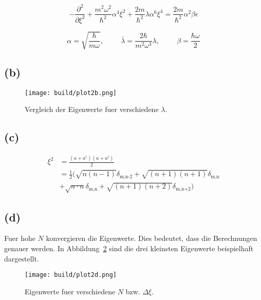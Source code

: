 \documentclass{scrartcl}
\begin{document}
\begin{equation}
		- \frac{\partial^2}{\partial \xi^2} + \frac{m^2
		\omega^2}{\hbar^2} \alpha^4 \xi^2 + \frac{2m}{\hbar^2} \lambda \alpha^6
		\xi^4 = \frac{2m}{\hbar^2} \alpha^2 \beta \epsilon
\end{equation}

\begin{equation}
		\alpha = \sqrt{\frac{\hbar}{m \omega}}, \hspace{1cm} \bar{\lambda} =
		\frac{2 \hbar}{m^2 \omega^3} \lambda, \hspace{1cm} \beta = \frac{\hbar
		\omega}{2}
\end{equation}
\subsection*{(b)}
\begin{figure}[ht]
		\centering
		\texttt{[image: build/plot2b.png]}
		\caption{Vergleich der Eigenwerte fuer verschiedene $\lambda$.}%
		\label{fig:2b}
\end{figure}

\subsection*{(c)}

\begin{align}
		\xi^2 &= \frac{(a + a^\dagger)(a + a^\dagger)}{2} \\
			  &= \frac{1}{2} (
		\sqrt{n(n-1)} \delta_\text{m,n-2} + \sqrt{(n+1)(n+1)} \delta_\text{m,n} \\
		&+ \sqrt{n \cdot n} \delta_\text{m,n} +  \sqrt{(n+1)(n+2)}
		\delta_\text{m,n+2} )
\end{align}

\subsection*{(d)}
Fuer hohe $N$ konvergieren die Eigenwerte.
Dies bedeutet, dass die Berechnungen genauer werden.
In Abbildung~\ref{fig:2d} sind die drei kleinsten Eigenwerte beispielhaft dargestellt.
\begin{figure}[ht]
		\centering
		\texttt{[image: build/plot2d.png]}
		\caption{Eigenwerte fuer verschiedene $N$ bzw. $\Delta \xi$.}%
		\label{fig:2d}
\end{figure}
\end{document}
